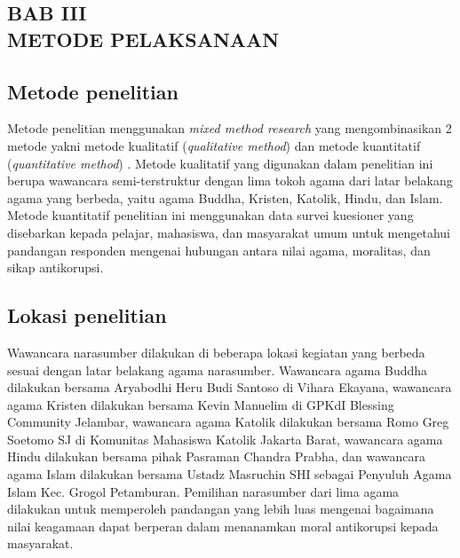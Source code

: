 \newpage

\renewcommand\thesection{3}
\renewcommand\thesubsection{\arabic{subsection}}

\setcounter{subsection}{0}

\captionsetup[table]{labelsep=quad}
\renewcommand{\thetable}{\arabic{section}.\arabic{table}}

\begin{center}
    \section*{\textbf{BAB III \\ METODE PELAKSANAAN}}
\end{center}

\subsection{Metode penelitian}

Metode penelitian menggunakan \textit{mixed method research} yang mengombinasikan 2 metode yakni metode kualitatif (\textit{qualitative method}) dan metode kuantitatif (\textit{quantitative method}) \citep{subedi2023}. Metode kualitatif yang digunakan dalam penelitian ini berupa wawancara semi-terstruktur dengan lima tokoh agama dari latar belakang agama yang berbeda, yaitu agama Buddha, Kristen, Katolik, Hindu, dan Islam. Metode kuantitatif penelitian ini menggunakan data survei kuesioner yang disebarkan kepada pelajar, mahasiswa, dan masyarakat umum untuk mengetahui pandangan responden mengenai hubungan antara nilai agama, moralitas, dan sikap antikorupsi.

\subsection{Lokasi penelitian}

Wawancara narasumber dilakukan di beberapa lokasi kegiatan yang berbeda sesuai dengan latar belakang agama narasumber. Wawancara agama Buddha dilakukan bersama Aryabodhi Heru Budi Santoso di Vihara Ekayana, wawancara agama Kristen dilakukan bersama Kevin Manuelim di GPKdI Blessing Community Jelambar, wawancara agama Katolik dilakukan bersama Romo Greg Soetomo SJ di Komunitas Mahasiswa Katolik Jakarta Barat, wawancara agama Hindu dilakukan bersama pihak Pasraman Chandra Prabha, dan wawancara agama Islam dilakukan bersama Ustadz Masruchin SHI sebagai Penyuluh Agama Islam Kec. Grogol Petamburan. Pemilihan narasumber dari lima agama dilakukan untuk memperoleh pandangan yang lebih luas mengenai bagaimana nilai keagamaan dapat berperan dalam menanamkan moral antikorupsi kepada masyarakat.

